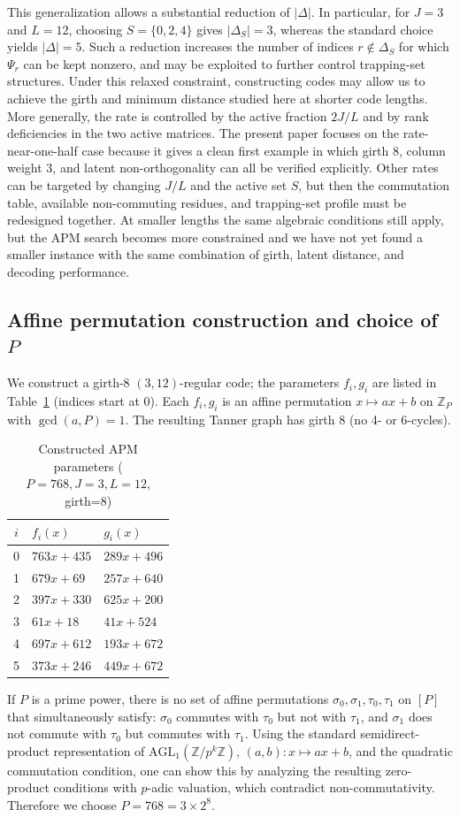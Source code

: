 \documentclass[a4paper,onecolumn,11pt,accepted=2026-08-03]{quantumarticle}
\newcommand{\ZP}{\mathbb{Z}_P}
\renewcommand\[{\begin{equation}}
\renewcommand\]{\end{equation}}
\theoremstyle{definition}
\begin{document}
This generalization allows a substantial reduction of $|\Delta|$.
In particular, for $J=3$ and $L=12$, choosing $S=\{0,2,4\}$ gives $|\Delta_S|=3$,
whereas the standard choice yields $|\Delta|=5$.
Such a reduction increases the number of indices $r\notin\Delta_S$ for which $\Psi_r$
can be kept nonzero, and may be exploited to further control trapping-set structures.
Under this relaxed constraint, constructing codes may allow us to achieve the girth and minimum distance studied here at shorter code lengths.
 {More generally, the rate is controlled by the active fraction $2J/L$ and by rank deficiencies in the two active matrices.
The present paper focuses on the rate-near-one-half case because it gives a clean first example in which girth 8, column weight 3, and latent non-orthogonality can all be verified explicitly.
Other rates can be targeted by changing $J/L$ and the active set $S$, but then the commutation table, available non-commuting residues, and trapping-set profile must be redesigned together.
At smaller lengths the same algebraic conditions still apply, but the APM search becomes more constrained and we have not yet found a smaller instance with the same combination of girth, latent distance, and decoding performance.}
 


\subsection{Affine permutation construction and choice of \texorpdfstring{$P$}{P}}
We construct a girth-8 $(3,12)$-regular code; the parameters $f_i,g_i$ are listed in Table~\ref{tab:apm-fg-params} (indices start at 0). Each $f_i,g_i$ is an affine permutation $x\mapsto ax+b$ on $\ZP$ with $\gcd(a,P)=1$. The resulting Tanner graph has girth 8 (no 4- or 6-cycles). 
\begin{table}[t]
\centering
\caption{Constructed APM parameters ($P=768,J=3,L=12$, girth=8)}
\label{tab:apm-fg-params}
\renewcommand{\arraystretch}{1.1}
\small
\begin{tabular}{c|l|l}
\hline
$i$ & $f_i(x)$ & $g_i(x)$ \\
\hline
0 & $763x+435$ & $289x+496$ \\
1 & $679x+69$ & $257x+640$ \\
2 & $397x+330$ & $625x+200$ \\
3 & $61x+18$ & $41x+524$ \\
4 & $697x+612$ & $193x+672$ \\
5 & $373x+246$ & $449x+672$ \\
\hline
\end{tabular}
\end{table}
If $P$ is a prime power, there is no set of affine permutations $\sigma_0,\sigma_1,\tau_0,\tau_1$ on $[P]$ that simultaneously satisfy: $\sigma_0$ commutes with $\tau_0$ but not with $\tau_1$, and $\sigma_1$ does not commute with $\tau_0$ but commutes with $\tau_1$. Using the standard semidirect-product representation of $\mathrm{AGL}_1(\mathbb{Z}/p^k\mathbb{Z})$, $(a,b):x\mapsto ax+b$, and the quadratic commutation condition, one can show this by analyzing the resulting zero-product conditions with $p$-adic valuation, which contradict non-commutativity. Therefore we choose $P=768=3\times 2^8$.
\end{document}
